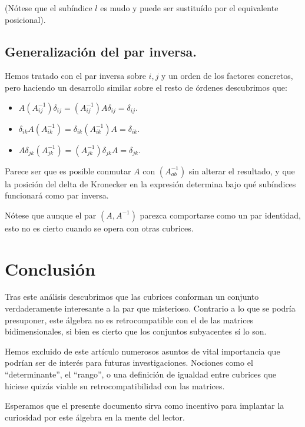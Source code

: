 \documentclass[a4paper, titlepage]{article}
\begin{document}
(Nótese que el subíndice $l$ es mudo y puede ser sustituído por el equivalente posicional).

\subsection{Generalización del par inversa.}

Hemos tratado con el par inversa sobre $i, j$ y un orden de los factores concretos, pero haciendo un desarrollo similar sobre el resto de órdenes descubrimos que:

\begin{itemize}
	\item $A(A_{ij}^{-1})\delta_{ij} = (A_{ij}^{-1})A\delta_{ij} = \delta_{ij}$.
	\item $\delta_{ik}A(A_{ik}^{-1}) = \delta_{ik}(A_{ik}^{-1})A = \delta_{ik}$.
	\item $A\delta_{jk}(A_{jk}^{-1}) = (A_{jk}^{-1})\delta_{jk}A = \delta_{jk}$.
\end{itemize}

Parece ser que es posible conmutar $A$ con $(A_{ab}^{-1})$ sin alterar el resultado, y que la posición del delta de Kronecker en la expresión determina bajo qué subíndices funcionará como par inversa.

Nótese que aunque el par $(A, A^{-1})$ parezca comportarse como un par identidad, esto no es cierto cuando se opera con otras cubrices.

\section{Conclusión}

Tras este análisis descubrimos que las cubrices conforman un conjunto verdaderamente interesante a la par que misterioso. Contrario a lo que se podría presuponer, este álgebra no es retrocompatible con el de las matrices bidimensionales, si bien es cierto que los conjuntos subyacentes sí lo son.

Hemos excluido de este artículo numerosos asuntos de vital importancia que podrían ser de interés para futuras investigaciones. Nociones como el ``determinante'', el ``rango'', o una definición de igualdad entre cubrices que hiciese quizás viable su retrocompatibilidad con las matrices.

Esperamos que el presente documento sirva como incentivo para implantar la curiosidad por este álgebra en la mente del lector.

\newpage
\appendix
\end{document}
